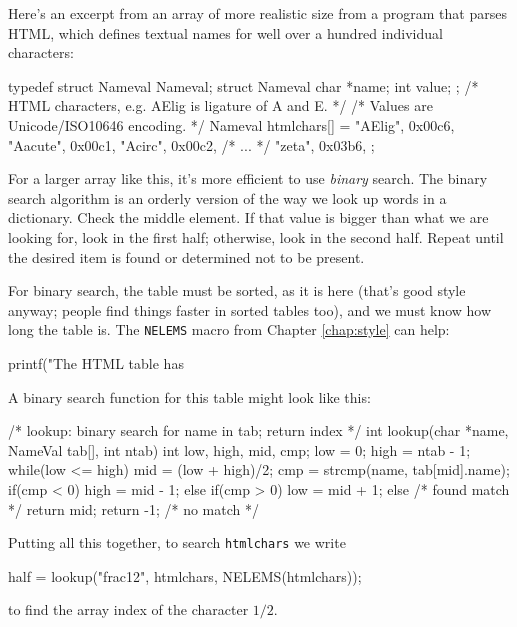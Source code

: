 Here's an excerpt from an array of more realistic size from a program that
parses HTML, which defines textual names for well over a hundred individual
characters:
\begin{wellcode}
    typedef struct Nameval Nameval;
    struct Nameval{
        char *name;
        int value;
    };
    /* HTML characters, e.g. AElig is ligature of A and E. */
    /* Values are Unicode/ISO10646 encoding. */
    Nameval htmlchars[] = {
        "AElig",    0x00c6,
        "Aacute",   0x00c1,
        "Acirc",    0x00c2,
        /* ... */
        "zeta",     0x03b6,
    };
\end{wellcode}

For a larger array like this, it's more efficient to use
\textit{binary} search. The binary search algorithm is an orderly
version of the way we look up words in a dictionary. Check the middle
element. If that value is bigger than what we are looking for, look in the
first half; otherwise, look in the second half. Repeat until the desired
item is found or determined not to be present.

For binary search, the table must be sorted, as it is here (that's good
style anyway; people find things faster in sorted tables too), and we must
know how long the table is. The \verb'NELEMS' macro from Chapter
\ref{chap:style} can
help:
\begin{wellcode}
    printf("The HTML table has %
\end{wellcode}

A binary search function for this table might look like this:
\begin{wellcode}
    /* lookup: binary search for name in tab; return index */
    int lookup(char *name, NameVal tab[], int ntab)
    {
        int low, high, mid, cmp;
        low = 0;
        high = ntab - 1;
        while(low <= high){
            mid = (low + high)/2;
            cmp = strcmp(name, tab[mid].name);
            if(cmp < 0){
                high = mid - 1;
            }
            else if(cmp > 0){
                low = mid + 1;
            }
            else{   /* found match */
                return mid;
            }
        }
        return -1;  /* no match */
    }
\end{wellcode}
Putting all this together, to search \verb'htmlchars' we write
\begin{wellcode}
    half = lookup("frac12", htmlchars, NELEMS(htmlchars));
\end{wellcode}
to find the array index of the character $1/2$.

